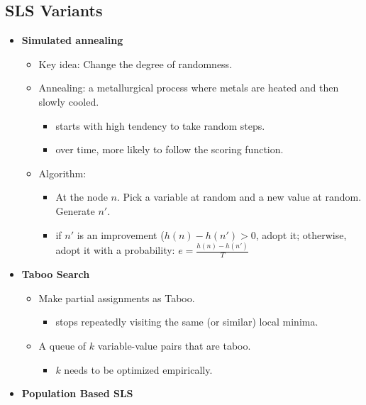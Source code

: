 \documentclass{article}
\begin{document}
\subsection{SLS Variants}

\begin{itemize}
    \item \textbf{Simulated annealing}
        \begin{itemize}
            \item Key idea: Change the degree of randomness.
            \item Annealing: a metallurgical process where metals are heated and then slowly cooled.
                \begin{itemize}
                    \item starts with high tendency to take random steps.
                    \item over time, more likely to follow the scoring function.
                \end{itemize}
            \item Algorithm:
                \begin{itemize}
                    \item At the node $n$. Pick a variable at random and a new value at random. Generate $n'$.
                    \item if $n'$ is an improvement ($h(n) - h(n') > 0$, adopt it; otherwise, adopt it with a probability: $e = \frac{h(n) - h(n')}{T}$
                \end{itemize}
        \end{itemize}
    \item \textbf{Taboo Search}
        \begin{itemize}
            \item Make partial assignments as Taboo.
            \begin{itemize}
                \item stops repeatedly visiting the same (or similar) local minima.
            \end{itemize}
            \item A queue of $k$ variable-value pairs that are taboo.
                \begin{itemize}
                    \item $k$ needs to be optimized empirically.
                \end{itemize}
        \end{itemize}
    \item \textbf{Population Based SLS}

\end{itemize}
\end{document}
